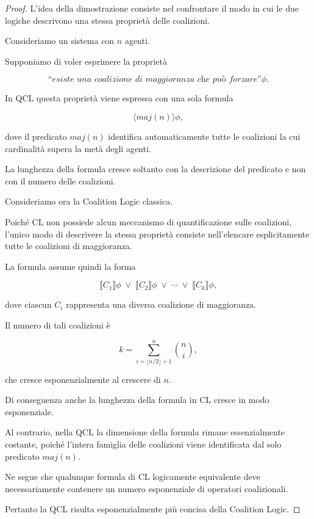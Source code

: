 \documentclass[12pt]{article}
\newcommand{\CL}[1]{\llbracket #1 \rrbracket}
\begin{document}
\begin{proof}

	L'idea della dimostrazione consiste nel confrontare il modo in cui le due
	logiche descrivono una stessa proprietà delle coalizioni.

	Consideriamo un sistema con $n$ agenti.

	Supponiamo di voler esprimere la proprietà

	\[
		\textit{``esiste una coalizione di maggioranza che può forzare''} \phi.
	\]

	In QCL questa proprietà viene espressa con una sola formula

	\[
		\langle maj(n)\rangle \phi,
	\]

	dove il predicato $maj(n)$ identifica automaticamente tutte le coalizioni
	la cui cardinalità supera la metà degli agenti.

	La lunghezza della formula cresce soltanto con la descrizione del
	predicato e non con il numero delle coalizioni.

	Consideriamo ora la Coalition Logic classica.

	Poiché CL non possiede alcun meccanismo di quantificazione sulle
	coalizioni, l'unico modo di descrivere la stessa proprietà consiste
	nell'elencare esplicitamente tutte le coalizioni di maggioranza.

	La formula assume quindi la forma

	\[
		\CL{C_1}\phi
		\;\lor\;
		\CL{C_2}\phi
		\;\lor\;
		\cdots
		\;\lor\;
		\CL{C_k}\phi,
	\]

	dove ciascun $C_i$ rappresenta una diversa coalizione di maggioranza.

	Il numero di tali coalizioni è

	\[
		k
		=
		\sum_{i=\lfloor n/2\rfloor+1}^{n}
		\binom{n}{i},
	\]

	che cresce esponenzialmente al crescere di $n$.

	Di conseguenza anche la lunghezza della formula in CL cresce in modo
	esponenziale.

	Al contrario, nella QCL la dimensione della formula rimane
	essenzialmente costante, poiché l'intera famiglia delle coalizioni viene
	identificata dal solo predicato $maj(n)$.

	Ne segue che qualunque formula di CL logicamente equivalente deve
	necessariamente contenere un numero esponenziale di operatori
	coalizionali.

	Pertanto la QCL risulta esponenzialmente più concisa della Coalition
	Logic.

\end{proof}
\end{document}
